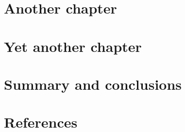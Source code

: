 \label{chapter:introduction}



\chapter{Another chapter}


\chapter{Yet another chapter}

\chapter{Summary and conclusions}

\chapter{References}
\printbibliography[heading = none]


